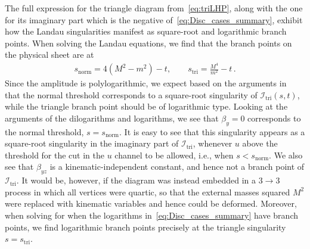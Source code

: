 \documentclass[12pt]{article}
\numberwithin{figure}{section}
\def \I {\mathcal{I}}
\def \triangle {\mathrm{tri}}
\def \normal {\mathrm{norm}}
\begin{document}
    The full expression for the triangle diagram from~\eqref{eq:triLHP}, along with the one for its imaginary part which is the negative of~\eqref{eq:Disc_cases_summary}, exhibit how the Landau singularities manifest as square-root and logarithmic branch points. When solving the Landau equations, we find that the branch points on the physical sheet are at
    \begin{align}
        s_{\normal} = 4(M^2 - m^2) - t,\qquad s_{\triangle} = \frac{M^4}{m^2} - t \,.
    \end{align}
    Since the amplitude is polylogarithmic, we expect based on the arguments in~\cite{Landau:1959fi} that the normal threshold corresponds to a square-root singularity of $\I_\triangle(s,t)$, while the triangle branch point should be of logarithmic type.
    Looking at the arguments of the dilogarithms and logarithms, we see that $\beta_y=0$ corresponds to the normal threshold, $s=s_\normal$. It is easy to see that this singularity appears as a square-root singularity in the imaginary part of $\I_{\triangle}$, whenever $u$ above the threshold for the cut in the $u$ channel to be allowed, i.e., when $s<s_\normal$. We also see that $\beta_{yz}$ is a kinematic-independent constant, and hence not a branch point of $\I_{\triangle}$. It would be, however, if the diagram was instead embedded in a $3\to3$ process in which all vertices were quartic, so that the external masses squared $M^2$ were replaced with kinematic variables and hence could be deformed. Moreover, when solving for when the logarithms in~\eqref{eq:Disc_cases_summary} have branch points, we find logarithmic branch points precisely at the triangle singularity $s=s_\triangle$. 
    
\end{document}
